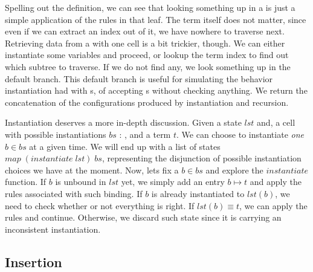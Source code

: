 Spelling out the definition, we can see that looking something up in a  is 
just a simple application of the rules in that leaf. The term itself does not matter, since
even if we can extract an index out of it, we have nowhere to traverse next. Retrieving data
from a  with one cell is a bit trickier, though. We can either
instantiate some variables and proceed, or lookup the term index to find out which subtree
to traverse. If we do not find any, we look something up in the default branch. This default branch
is useful for simulating the behavior instantiation had with s, of accepting
s without checking anything. We return the concatenation of the configurations produced
by instantiation and recursion.

Instantiation deserves a more in-depth discussion. Given a state $lst$ and, a cell with possible
instantiations $bs$ : , and a term $t$. 
We can choose to instantiate \emph{one}
$b \in bs$ at a given time. We will end up with a list of states $map\; (instantiate\; lst)\; bs$,
representing the disjunction of possible instantiation choices we have at the moment.
Now, lets fix a $b \in bs$ and explore the $instantiate$ function. If $b$ is unbound in $lst$ yet,
we simply add an entry $b \mapsto t$ and apply the rules associated with such binding.
If $b$ is already instantiated to $lst(b)$, we need to check whether or not everything
is right. If $lst(b) \equiv t$, we can apply the rules and continue. Otherwise, we discard such state
since it is carrying an inconsistent instantiation.


\subsection{Insertion}

